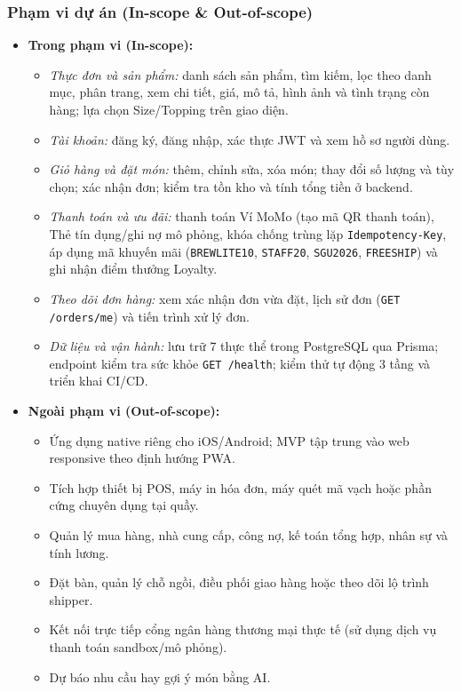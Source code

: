 \subsubsection{Phạm vi dự án (In-scope \& Out-of-scope)}
\begin{itemize}
    \item \textbf{Trong phạm vi (In-scope):}
    \begin{itemize}
        \item \textit{Thực đơn và sản phẩm:} danh sách sản phẩm, tìm kiếm, lọc theo danh mục, phân trang, xem chi tiết, giá, mô tả, hình ảnh và tình trạng còn hàng; lựa chọn Size/Topping trên giao diện.
        \item \textit{Tài khoản:} đăng ký, đăng nhập, xác thực JWT và xem hồ sơ người dùng.
        \item \textit{Giỏ hàng và đặt món:} thêm, chỉnh sửa, xóa món; thay đổi số lượng và tùy chọn; xác nhận đơn; kiểm tra tồn kho và tính tổng tiền ở backend.
        \item \textit{Thanh toán và ưu đãi:} thanh toán Ví MoMo (tạo mã QR thanh toán), Thẻ tín dụng/ghi nợ mô phỏng, khóa chống trùng lặp \texttt{Idempotency-Key}, áp dụng mã khuyến mãi (\texttt{BREWLITE10}, \texttt{STAFF20}, \texttt{SGU2026}, \texttt{FREESHIP}) và ghi nhận điểm thưởng Loyalty.
        \item \textit{Theo dõi đơn hàng:} xem xác nhận đơn vừa đặt, lịch sử đơn (\texttt{GET /orders/me}) và tiến trình xử lý đơn.
        \item \textit{Dữ liệu và vận hành:} lưu trữ 7 thực thể trong PostgreSQL qua Prisma; endpoint kiểm tra sức khỏe \texttt{GET /health}; kiểm thử tự động 3 tầng và triển khai CI/CD.
    \end{itemize}
    \item \textbf{Ngoài phạm vi (Out-of-scope):}
    \begin{itemize}
        \item Ứng dụng native riêng cho iOS/Android; MVP tập trung vào web responsive theo định hướng PWA.
        \item Tích hợp thiết bị POS, máy in hóa đơn, máy quét mã vạch hoặc phần cứng chuyên dụng tại quầy.
        \item Quản lý mua hàng, nhà cung cấp, công nợ, kế toán tổng hợp, nhân sự và tính lương.
        \item Đặt bàn, quản lý chỗ ngồi, điều phối giao hàng hoặc theo dõi lộ trình shipper.
        \item Kết nối trực tiếp cổng ngân hàng thương mại thực tế (sử dụng dịch vụ thanh toán sandbox/mô phỏng).
        \item Dự báo nhu cầu hay gợi ý món bằng AI.
    \end{itemize}
\end{itemize}

